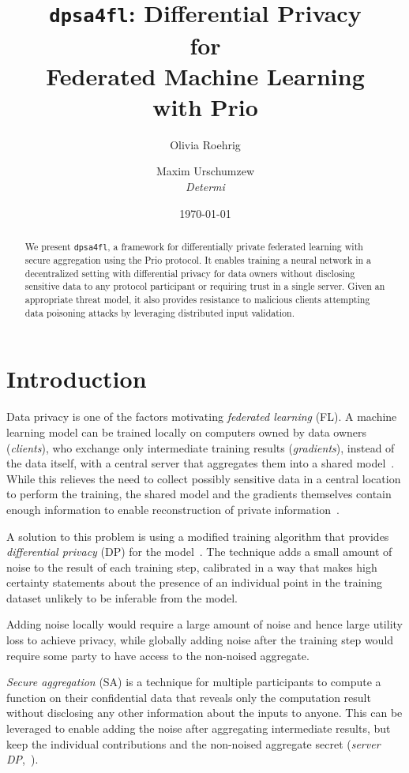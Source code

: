 \documentclass{article}
\title{\texttt{dpsa4fl}: Differential Privacy \\ for \\ Federated Machine
  Learning \\ with Prio}
\author{Olivia Roehrig  \\
	\and
	Maxim Urschumzew \\
	\textit{Determi} \\
	}
\date{\today}
\begin{document}
\maketitle


\begin{abstract}
We present \texttt{dpsa4fl}, a framework for differentially private federated
learning with secure aggregation using the Prio protocol. It enables training a
neural network in a decentralized setting with differential privacy for data
owners without disclosing sensitive data to any protocol participant or
requiring trust in a single server. Given an appropriate threat model, it also
provides resistance to malicious clients attempting data poisoning attacks by
leveraging distributed input validation.
\end{abstract}

\section{Introduction}
Data privacy is one of the factors motivating \emph{federated learning} (FL). A
machine learning model can be trained locally on computers owned by data owners
(\emph{clients}), who exchange only intermediate training results
(\emph{gradients}), instead of the data itself, with a central server that
aggregates them into a shared model~\cite{McMahan2016CommunicationEfficientLO}.
While this relieves the need to collect possibly sensitive data in a central
location to perform the training, the shared model and the gradients themselves
contain enough information to enable reconstruction of private
information~\cite{7958568,Boenisch2021WhenTC}.

A solution to this problem is using a modified training algorithm that provides
\emph{differential privacy} (DP) for the model~\cite{Abadi_2016}. The technique adds
a small amount of noise to the result of each training step, calibrated in a way
that makes high certainty statements about the presence of an individual point
in the training dataset unlikely to be inferable from the model.

Adding noise locally would require a large amount of noise and hence large
utility loss to achieve privacy, while globally adding noise after the training
step would require some party to have access to the non-noised aggregate.

\emph{Secure aggregation} (SA) is a technique for multiple
participants to compute a function on their confidential data that reveals only
the computation result without disclosing any other information about the
inputs to anyone. This can be leveraged to enable adding the noise after aggregating
intermediate results, but keep the individual contributions and the non-noised
aggregate secret (\emph{server DP},~\cite{dprio}).
\end{document}
